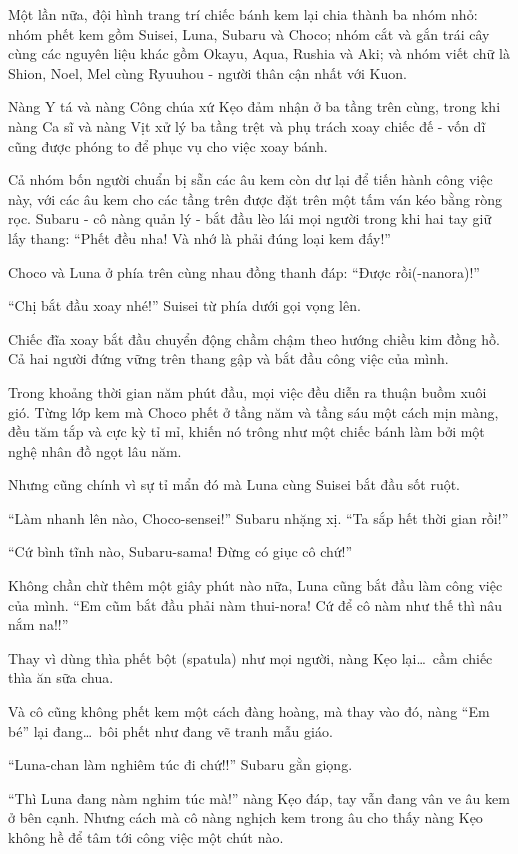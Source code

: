 \documentclass[../main.tex]{subfiles}
\begin{document}
Một lần nữa, đội hình trang trí chiếc bánh kem lại chia thành ba nhóm nhỏ: nhóm phết kem gồm Suisei, Luna, Subaru và Choco; nhóm cắt và gắn trái cây cùng các nguyên liệu khác gồm Okayu, Aqua, Rushia và Aki; và nhóm viết chữ là Shion, Noel, Mel cùng Ryuuhou - người thân cận nhất với Kuon.

Nàng Y tá và nàng Công chúa xứ Kẹo đảm nhận ở ba tầng trên cùng, trong khi nàng Ca sĩ và nàng Vịt xử lý ba tầng trệt và phụ trách xoay chiếc đế - vốn dĩ cũng được phóng to để phục vụ cho việc xoay bánh.

Cả nhóm bốn người chuẩn bị sẵn các âu kem còn dư lại để tiến hành công việc này, với các âu kem cho các tầng trên được đặt trên một tấm ván kéo bằng ròng rọc. Subaru - cô nàng quản lý - bắt đầu lèo lái mọi người trong khi hai tay giữ lấy thang: ``Phết đều nha! Và nhớ là phải đúng loại kem đấy!''

Choco và Luna ở phía trên cùng nhau đồng thanh đáp: ``Được rồi(-nanora)!''

``Chị bắt đầu xoay nhé!'' Suisei từ phía dưới gọi vọng lên.

Chiếc đĩa xoay bắt đầu chuyển động chầm chậm theo hướng chiều kim đồng hồ. Cả hai người đứng vững trên thang gập và bắt đầu công việc của mình.

Trong khoảng thời gian năm phút đầu, mọi việc đều diễn ra thuận buồm xuôi gió. Từng lớp kem mà Choco phết ở tầng năm và tầng sáu một cách mịn màng, đều tăm tắp và cực kỳ tỉ mỉ, khiến nó trông như một chiếc bánh làm bởi một nghệ nhân đồ ngọt lâu năm.

Nhưng cũng chính vì sự tỉ mẩn đó mà Luna cùng Suisei bắt đầu sốt ruột.

``Làm nhanh lên nào, Choco-sensei!'' Subaru nhặng xị. ``Ta sắp hết thời gian rồi!''

``Cứ bình tĩnh nào, Subaru-sama! Đừng có giục cô chứ!''

Không chần chừ thêm một giây phút nào nữa, Luna cũng bắt đầu làm công việc của mình. ``Em cũm bắt đầu phải nàm thui-nora! Cứ để cô nàm như thế thì nâu nắm na!!''

Thay vì dùng thìa phết bột (spatula) như mọi người, nàng Kẹo lại\dots\ cầm chiếc thìa ăn sữa chua.

Và cô cũng không phết kem một cách đàng hoàng, mà thay vào đó, nàng ``Em bé'' lại đang\dots\ bôi phết như đang vẽ tranh mẫu giáo.

``Luna-chan làm nghiêm túc đi chứ!!'' Subaru gằn giọng.

``Thì Luna đang nàm nghim túc mà!'' nàng Kẹo đáp, tay vẫn đang vân ve âu kem ở bên cạnh. Nhưng cách mà cô nàng nghịch kem trong âu cho thấy nàng Kẹo không hề để tâm tới công việc một chút nào.
\end{document}

